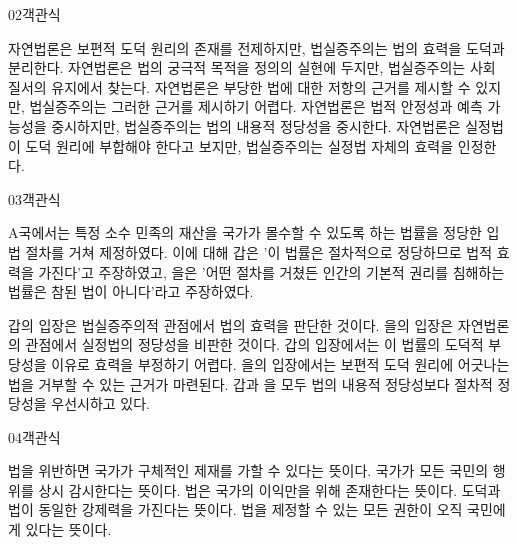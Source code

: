 \documentclass[fs85,seriesWit]{korfarm-base}
\begin{document}
\begin{kfQBlock}{02}{객관식}
\begin{kfChoices}
\kfChoice 자연법론은 보편적 도덕 원리의 존재를 전제하지만, 법실증주의는 법의 효력을 도덕과 분리한다.
\kfChoice 자연법론은 법의 궁극적 목적을 정의의 실현에 두지만, 법실증주의는 사회 질서의 유지에서 찾는다.
\kfChoice 자연법론은 부당한 법에 대한 저항의 근거를 제시할 수 있지만, 법실증주의는 그러한 근거를 제시하기 어렵다.
\kfChoice 자연법론은 법적 안정성과 예측 가능성을 중시하지만, 법실증주의는 법의 내용적 정당성을 중시한다.
\kfChoice 자연법론은 실정법이 도덕 원리에 부합해야 한다고 보지만, 법실증주의는 실정법 자체의 효력을 인정한다.
\end{kfChoices}
\end{kfQBlock}

\begin{kfQBlock}{03}{객관식}
\begin{kfEvidence}A국에서는 특정 소수 민족의 재산을 국가가 몰수할 수 있도록 하는 법률을 정당한 입법 절차를 거쳐 제정하였다. 이에 대해 갑은 '이 법률은 절차적으로 정당하므로 법적 효력을 가진다'고 주장하였고, 을은 '어떤 절차를 거쳤든 인간의 기본적 권리를 침해하는 법률은 참된 법이 아니다'라고 주장하였다.\end{kfEvidence}
\begin{kfChoices}
\kfChoice 갑의 입장은 법실증주의적 관점에서 법의 효력을 판단한 것이다.
\kfChoice 을의 입장은 자연법론의 관점에서 실정법의 정당성을 비판한 것이다.
\kfChoice 갑의 입장에서는 이 법률의 도덕적 부당성을 이유로 효력을 부정하기 어렵다.
\kfChoice 을의 입장에서는 보편적 도덕 원리에 어긋나는 법을 거부할 수 있는 근거가 마련된다.
\kfChoice 갑과 을 모두 법의 내용적 정당성보다 절차적 정당성을 우선시하고 있다.
\end{kfChoices}
\end{kfQBlock}

\begin{kfQBlock}{04}{객관식}
\begin{kfChoices}
\kfChoice 법을 위반하면 국가가 구체적인 제재를 가할 수 있다는 뜻이다.
\kfChoice 국가가 모든 국민의 행위를 상시 감시한다는 뜻이다.
\kfChoice 법은 국가의 이익만을 위해 존재한다는 뜻이다.
\kfChoice 도덕과 법이 동일한 강제력을 가진다는 뜻이다.
\kfChoice 법을 제정할 수 있는 모든 권한이 오직 국민에게 있다는 뜻이다.
\end{kfChoices}
\end{kfQBlock}
\end{document}
